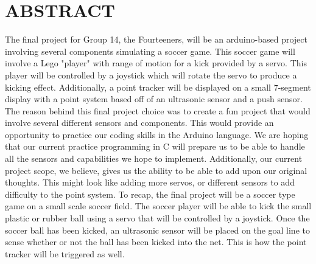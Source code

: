 \documentclass[12pt]{article}
\begin{document}
\tableofcontents
\pagebreak

\section{ABSTRACT}
The final project for Group 14, the Fourteeners, will be an arduino-based project involving several components simulating a soccer game. This soccer game will involve a Lego "player" with range of motion for a kick provided by a servo. This player will be controlled by a joystick which will rotate the servo to produce a kicking effect. Additionally, a point tracker will be displayed on a small 7-segment display with a point system based off of an ultrasonic sensor and a push sensor.
The reason behind this final project choice was to create a fun project that would involve several different sensors and components. This would provide an opportunity to practice our coding skills in the Arduino language. We are hoping that our current practice programming in C will prepare us to be able to handle all the sensors and capabilities we hope to implement. Additionally, our current project scope, we believe, gives us the ability to be able to add upon our original thoughts. This might look like adding more servos, or different sensors to add difficulty to the point system.
To recap, the final project will be a soccer type game on a small scale soccer field. The soccer player will be able to kick the small plastic or rubber ball using a servo that will be controlled by a joystick. Once the soccer ball has been kicked, an ultrasonic sensor will be placed on the goal line to sense whether or not the ball has been kicked into the net. This is how the point tracker will be triggered as well.
\end{document}

